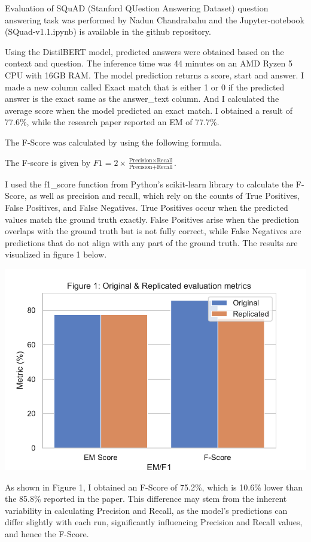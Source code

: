 \documentclass[
  11pt,
]{article}
\begin{document}
Evaluation of SQuAD (Stanford QUestion Answering Dataset) question
answering task was performed by Nadun Chandrabahu and the
Jupyter-notebook (SQuad-v1.1.ipynb) is available in the github
repository.

Using the DistilBERT model, predicted answers were obtained based on the
context and question. The inference time was 44 minutes on an AMD Ryzen
5 CPU with 16GB RAM. The model prediction returns a score, start and
answer. I made a new column called Exact match that is either 1 or 0 if
the predicted answer is the exact same as the answer\_text column. And I
calculated the average score when the model predicted an exact match. I
obtained a result of 77.6\%, while the research paper reported an EM of
77.7\%.

The F-Score was calculated by using the following formula.

The F-score is given by
\(F1 = 2 \times \frac{\text{Precision} \times \text{Recall}}{\text{Precision} + \text{Recall}}\).

I used the f1\_score function from Python's scikit-learn library to
calculate the F-Score, as well as precision and recall, which rely on
the counts of True Positives, False Positives, and False Negatives. True
Positives occur when the predicted values match the ground truth
exactly. False Positives arise when the prediction overlaps with the
ground truth but is not fully correct, while False Negatives are
predictions that do not align with any part of the ground truth. The
results are visualized in figure 1 below.

\includegraphics{Final-Report_files/figure-latex/squad_visualization-difference-1.pdf}

As shown in Figure 1, I obtained an F-Score of 75.2\%, which is 10.6\%
lower than the 85.8\% reported in the paper. This difference may stem
from the inherent variability in calculating Precision and Recall, as
the model's predictions can differ slightly with each run, significantly
influencing Precision and Recall values, and hence the F-Score.
\end{document}
